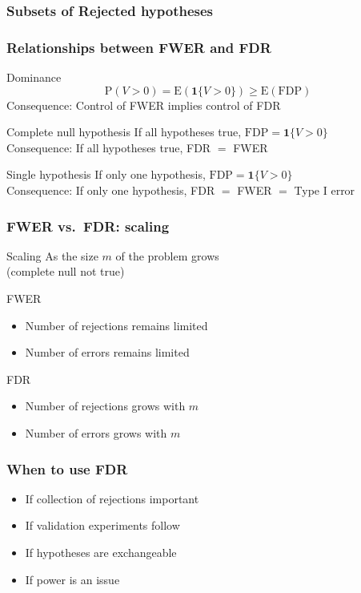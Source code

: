 \documentclass[xcolor={pdftex,dvipsnames,table}]{beamer}
\newcommand{\bb}[1]{\begin{block}{#1}}
\newcommand{\eb}{\end{block}}
\newcommand{\bi}{\begin {itemize}}
\newcommand{\ei}{\end{itemize}}
\newcommand{\bfr}[1]{\begin{frame} \frametitle{#1}}
\begin{document}
\bfr{Subsets of Rejected hypotheses}
\end{frame}




\bfr{Relationships between FWER and FDR}
  \bb{Dominance}
    \[ \mathrm{P}(V > 0) = \mathrm{E}(\boldsymbol{1}\{V > 0\}) \geq \mathrm{E}(\mathrm{FDP}) \]
    Consequence: Control of FWER implies control of FDR
  \eb
  \bb{Complete null hypothesis}
    If all hypotheses true, $\mathrm{FDP} = \boldsymbol{1}\{V > 0\}$
    \\ Consequence: If all hypotheses true, FDR $=$ FWER
  \eb
  \bb{Single hypothesis}
    If only one hypothesis, $\mathrm{FDP} = \boldsymbol{1}\{V > 0\}$
    \\ Consequence: If only one hypothesis, FDR $=$ FWER $=$ Type I error
  \eb
\end{frame}


\bfr{FWER vs.\ FDR: scaling}
  \bb{Scaling}
    As the size $m$ of the problem grows \\(complete null not true)
  \eb
  \bb{FWER}
    \bi
      \item Number of rejections remains limited
      \item Number of errors remains limited
    \ei
  \eb
  \bb{FDR}
    \bi
      \item Number of rejections grows with $m$
      \item Number of errors grows with $m$
    \ei
  \eb
\end{frame}


\bfr{When to use FDR}
    \bi
      \item If collection of rejections important
      \item If validation experiments follow
      \item If hypotheses are exchangeable
      \item If power is an issue
    \ei
\end{frame}
\end{document}
